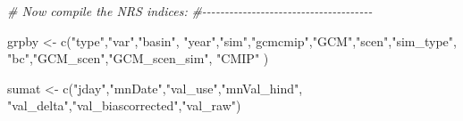 \documentclass[
]{article}
\newenvironment{Shaded}{\begin{snugshade}}{\end{snugshade}}
\newcommand{\CommentTok}[1]{\textcolor[rgb]{0.56,0.35,0.01}{\textit{#1}}}
\newcommand{\FunctionTok}[1]{\textcolor[rgb]{0.00,0.00,0.00}{#1}}
\newcommand{\NormalTok}[1]{#1}
\newcommand{\OtherTok}[1]{\textcolor[rgb]{0.56,0.35,0.01}{#1}}
\newcommand{\StringTok}[1]{\textcolor[rgb]{0.31,0.60,0.02}{#1}}
\begin{document}
\begin{Shaded}
\begin{Highlighting}[]
    \CommentTok{\# Now compile the NRS indices:}
    \CommentTok{\#{-}{-}{-}{-}{-}{-}{-}{-}{-}{-}{-}{-}{-}{-}{-}{-}{-}{-}{-}{-}{-}{-}{-}{-}{-}{-}{-}{-}{-}{-}{-}{-}{-}{-}{-}{-}{-}{-}}
    
\NormalTok{    grpby }\OtherTok{\textless{}{-}} \FunctionTok{c}\NormalTok{(}\StringTok{"type"}\NormalTok{,}\StringTok{"var"}\NormalTok{,}\StringTok{"basin"}\NormalTok{,}
               \StringTok{"year"}\NormalTok{,}\StringTok{"sim"}\NormalTok{,}\StringTok{"gcmcmip"}\NormalTok{,}\StringTok{"GCM"}\NormalTok{,}\StringTok{"scen"}\NormalTok{,}\StringTok{"sim\_type"}\NormalTok{,}
               \StringTok{"bc"}\NormalTok{,}\StringTok{"GCM\_scen"}\NormalTok{,}\StringTok{"GCM\_scen\_sim"}\NormalTok{, }\StringTok{"CMIP"}\NormalTok{ )}
    
\NormalTok{    sumat  }\OtherTok{\textless{}{-}} \FunctionTok{c}\NormalTok{(}\StringTok{"jday"}\NormalTok{,}\StringTok{"mnDate"}\NormalTok{,}\StringTok{"val\_use"}\NormalTok{,}\StringTok{"mnVal\_hind"}\NormalTok{,}
                \StringTok{"val\_delta"}\NormalTok{,}\StringTok{"val\_biascorrected"}\NormalTok{,}\StringTok{"val\_raw"}\NormalTok{)}
  

\end{Highlighting}
\end{Shaded}
\end{document}
